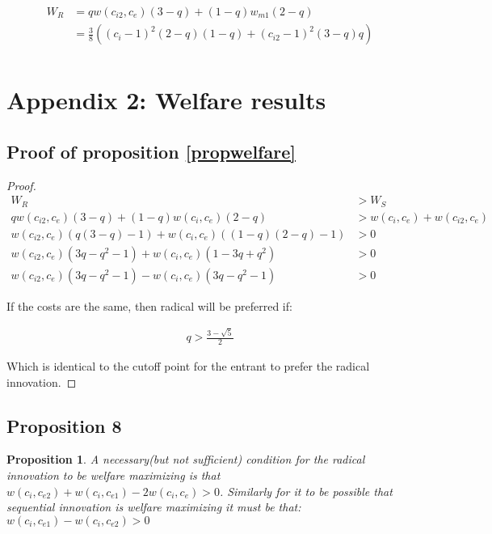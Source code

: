 \documentclass[11pt]{article}
\newtheorem{proposition}{Proposition}
\begin{document}
\begin{align*}
W_R &= q w(c_{i2}, c_{e})(3-q )
+(1-q)w_{m1}(2-q)  \\
&= \frac{3}{8} \left((c_i-1)^2 (2-q) (1-q)+(c_{i2}-1)^2 (3-q) q\right) \\
\end{align*}

\section*{Appendix 2: Welfare results}

\subsection{Proof of proposition \ref{propwelfare}}

\begin{proof} \label{buyoutnobuyout}
\begin{align*}
W_R&> W_S \\
q w(c_{i2}, c_{e})(3-q )
+(1-q)w(c_{i}, c_{e})(2-q) &> w(c_{i}, c_{e}) + w(c_{i2}, c_{e}) \\
 w(c_{i2}, c_{e})(q(3-q) -1)
+w(c_{i}, c_{e})((1-q)(2-q)-1)  &> 0 \\
w(c_{i2}, c_{e})(3q-q^2-1)+w(c_{i}, c_{e})(1-3q+q^2)&>0 \\
 w(c_{i2}, c_{e})(3q-q^2-1)-w(c_{i}, c_{e})(3q-q^2-1) &>0 
\end{align*}

If the costs are the same, then radical will be preferred if:

\begin{align}
q> \frac{3-\sqrt{5}}{2}
\end{align}

Which is identical to the cutoff point for the entrant to prefer the radical innovation. 

\end{proof}

\subsection{Proposition 8}

\begin{proposition}
\label{welfare1}
A necessary(but not sufficient) condition for the radical innovation to be welfare maximizing is that $w(c_{i}, c_{e2})+w(c_{i}, c_{e1})-2 w(c_{i}, c_{e}) > 0 $. 
Similarly for it to be possible that sequential innovation is welfare maximizing it must be that: 
$w(c_{i}, c_{e1})-w(c_{i}, c_{e2}) > 0$
\end{proposition}
\end{document}
